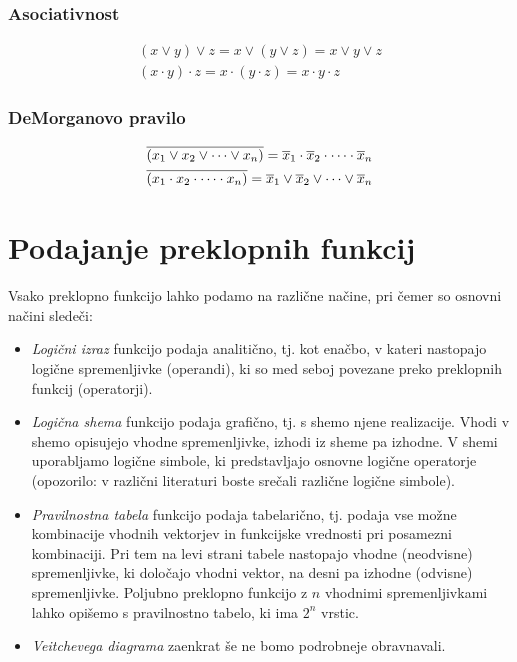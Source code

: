 \subsubsection*{Asociativnost}
\begin{align*}
\left(x \vee y \right)\vee z = x \vee \left(y \vee z \right)= x \vee y \vee z\\
\left(x \cdot y \right)\cdot z = x \cdot \left(y \cdot z \right)= x \cdot y \cdot z
\end{align*}

\subsubsection*{DeMorganovo pravilo}
\begin{align*}
\overline{\left(x_1 \vee x_2 \vee \dots \vee x_n \right)} = \overline x_1 \cdot \overline x_2 \cdot \dots \cdot \overline x_n\\
\overline{\left(x_1 \cdot x_2 \cdot \dots \cdot x_n \right)} = \overline x_1 \vee \overline x_2 \vee \dots \vee \overline x_n
\end{align*}



\section{Podajanje preklopnih funkcij}
Vsako preklopno funkcijo lahko podamo na različne načine, pri čemer so osnovni načini sledeči:
\begin{itemize}
\item \emph{Logični izraz} funkcijo podaja analitično, tj. kot enačbo, v kateri nastopajo logične spremenljivke (operandi), ki so med seboj povezane preko preklopnih funkcij (operatorji).
\item \emph{Logična shema} funkcijo podaja grafično, tj.  s shemo njene realizacije. Vhodi v shemo opisujejo vhodne spremenljivke, izhodi iz sheme pa izhodne. V shemi uporabljamo logične simbole, ki predstavljajo osnovne logične operatorje (opozorilo: v različni literaturi boste srečali različne logične simbole).
\item \emph{Pravilnostna tabela} funkcijo podaja tabelarično, tj. podaja vse možne kombinacije vhodnih vektorjev in funkcijske vrednosti pri posamezni kombinaciji. Pri tem na levi strani tabele nastopajo vhodne (neodvisne) spremenljivke, ki določajo vhodni vektor, na desni pa izhodne (odvisne) spremenljivke. Poljubno preklopno funkcijo z $n$ vhodnimi spremenljivkami lahko opišemo s pravilnostno tabelo, ki ima $2^n$ vrstic.
\item \emph{Veitchevega diagrama} zaenkrat še ne bomo podrobneje obravnavali.
\end{itemize}

